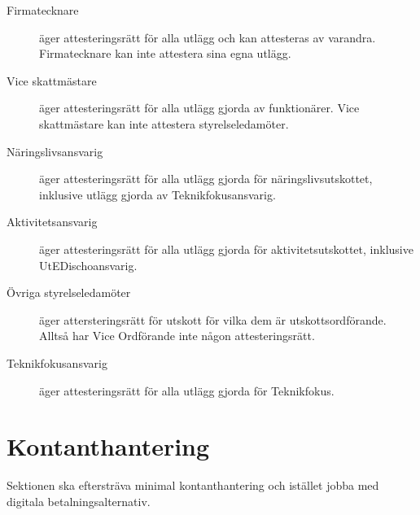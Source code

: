 \documentclass{dsekprotokoll}
\begin{document}
\begin{description}
  \item[Firmatecknare] äger attesteringsrätt för alla utlägg och kan attesteras
    av varandra. Firmatecknare kan inte attestera sina egna utlägg.
  \item[Vice skattmästare] äger attesteringsrätt för alla utlägg gjorda av
    funktionärer. Vice skattmästare kan inte attestera styrelseledamöter.
  \item[Näringslivsansvarig] äger attesteringsrätt för alla utlägg gjorda för
    näringslivsutskottet, inklusive utlägg gjorda av Teknikfokusansvarig.
  \item[Aktivitetsansvarig] äger attesteringsrätt för alla utlägg gjorda för
    aktivitetsutskottet, inklusive UtEDischoansvarig.
  \item[Övriga styrelseledamöter] äger attersteringsrätt för utskott för vilka
    dem är utskottsordförande. Alltså har Vice Ordförande inte någon
    attesteringsrätt.
  \item[Teknikfokusansvarig] äger attesteringsrätt för alla utlägg gjorda för
    Teknikfokus.
\end{description}

\begin{center}
\end{center}

\section{Kontanthantering}
Sektionen ska eftersträva minimal kontanthantering och istället jobba med
digitala betalningsalternativ.
\end{document}
